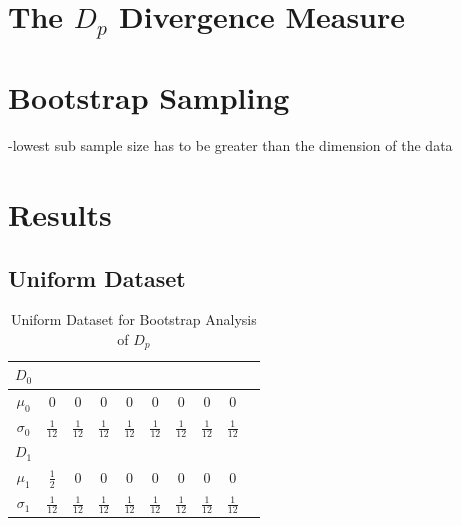 \documentclass{article}
\begin{document}
		
	
	\section{The $D_p$ Divergence Measure}
	\section{Bootstrap Sampling}

	-lowest sub sample size has to be greater than the dimension of the data
	
	
	\section{Results}
	
	\subsection*{\small Uniform Dataset}

	\begin{table}[ht]
	\caption{Uniform Dataset for Bootstrap Analysis of $D_p$}
	\centering %
	\begin{tabular}{c c c c c c c c c c} %
	$D_0$ &  &  &  \\ [0.5ex] %
	\hline %
	$\mu_0$ & 0 & 0 & 0 & 0 & 0 & 0 & 0 & 0\\[0.5ex] %
	$\sigma_0$ & \( \frac{1}{12} \) & \( \frac{1}{12} \) & \( \frac{1}{12} \) & \( \frac{1}{12} \) & \( \frac{1}{12} \) & \( \frac{1}{12} \) & \( \frac{1}{12} \) & \( \frac{1}{12} \) &  \\[2ex]

	$D_1$ & \\ [0.5ex]
	
	\hline
	$\mu_1$ & \( \frac{1}{2} \) & 0 & 0 & 0 & 0 & 0 & 0 & 0\\[0.5ex] %
	$\sigma_1$ & \( \frac{1}{12} \) & \( \frac{1}{12} \) & \( \frac{1}{12} \) & \( \frac{1}{12} \) & \( \frac{1}{12} \) & \( \frac{1}{12} \) & \( \frac{1}{12} \) & \( \frac{1}{12} \) &  \\ [1ex] %
	\hline %
	\end{tabular}
	\label{table:nonlin} %
	\end{table}
	
\end{document}
